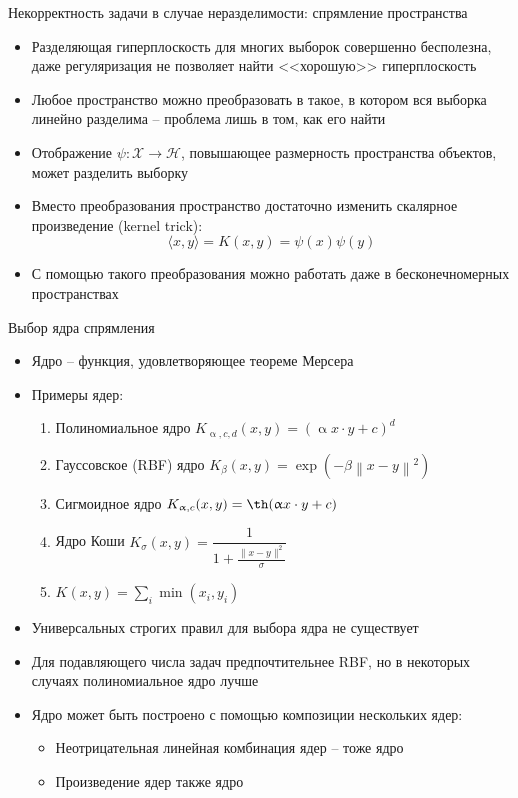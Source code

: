 \documentclass[red,unicode]{beamer}
\begin{document}
\begin{frame}{Некорректность задачи в случае неразделимости: спрямление пространства}
\begin{itemize}
	\item Разделяющая гиперплоскость для многих выборок совершенно бесполезна, даже регуляризация не позволяет найти <<хорошую>> гиперплоскость
	\item Любое пространство можно преобразовать в такое, в котором вся выборка линейно разделима -- проблема лишь в том, как его найти
	\item Отображение $\psi: \mathcal{X} \to \mathcal{H}$, повышающее размерность пространства объектов, может разделить выборку
	\item Вместо преобразования пространство достаточно изменить скалярное произведение (kernel trick): $$\langle x,y \rangle = K(x,y) = \psi(x)\psi(y)$$
	\item С помощью такого преобразования можно работать даже в бесконечномерных пространствах
\end{itemize}
\end{frame}

\begin{frame}{Выбор ядра спрямления}{}
\begin{itemize}
	\item Ядро -- функция, удовлетворяющее теореме Мерсера
	\item Примеры ядер:
	\begin{enumerate}
		\item Полиномиальное ядро $K_{\upalpha,c,d} (x,y) = (\upalpha x\cdot y + c)^d$\\
		\item Гауссовское (RBF) ядро $K_\beta (x,y) = \exp (-\beta \left\| x-y \right\|^2)$\\
		\item Сигмоидное ядро $K_{\upalpha,c}(x,y) = \th (\upalpha x \cdot y + c)$\\
		\item Ядро Коши $K_{\sigma} (x,y) = \dfrac{1}{1+ \frac{\| x-y \|^2}{\sigma}}$\\
		\item $K(x,y) = \sum_i \min (x_i, y_i)$
	\end{enumerate}
	\item Универсальных строгих правил для выбора ядра не существует
	\item Для подавляющего числа задач предпочтительнее RBF, но в некоторых случаях полиномиальное ядро лучше
	\item Ядро может быть построено с помощью композиции нескольких ядер:
	\begin{itemize}
	\item Неотрицательная линейная комбинация ядер -- тоже ядро
	\item Произведение ядер также ядро
	\end{itemize}
\end{itemize}
\end{frame}
\end{document}
